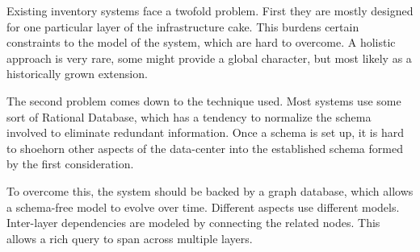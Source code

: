 Existing inventory systems face a twofold problem. First they are mostly designed for one particular layer of the infrastructure cake.
This burdens certain constraints to the model of the system, which are hard to overcome. A holistic approach is very rare, some might
provide a global character, but most likely as a historically grown extension.

The second problem comes down to the technique used. Most systems use some sort of Rational Database, which has a tendency to normalize
the schema involved to eliminate redundant information. Once a schema is set up, it is hard to shoehorn other aspects of the data-center into
the established schema formed by the first consideration.

To overcome this, the system should be backed by a graph database, which allows a schema-free model to evolve over time. Different aspects
use different models. Inter-layer dependencies are modeled by connecting the related nodes. This allows a rich query to span across multiple layers.

